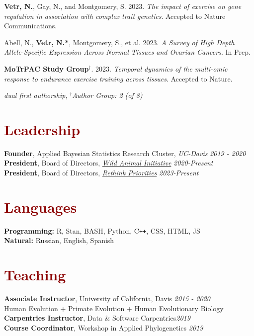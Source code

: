 \documentclass[11pt,margin,line]{resume}
\begin{document}
\begin{resume}
\textbf{Vetr, N.},  Gay,  N.,  and Montgomery,  S.  2023.  \emph{The impact of exercise on gene regulation in association with complex trait genetics}.  Accepted to Nature Communications.

Abell, N., \textbf{Vetr, N.*},  Montgomery, S., et al.  2023.  \emph{A Survey of High Depth Allele-Specific Expression Across Normal Tissues and Ovarian Cancers}.  In Prep.

\textbf{MoTrPAC Study Group}$^{\dag}$. 2023.  \emph{Temporal dynamics of the multi-omic response to endurance exercise training across tissues}.  Accepted to Nature. 

\vspace{-1.5mm}
{\hfill\small*\textit{dual first authorship}, $^{\dag}$\textit{Author Group: 2 (of 8)}}

\vspace{-1.5mm}
\section{\large\textcolor{DarkRed}{Leadership}}
\textbf{Founder}, Applied Bayesian Statistics Research Cluster, \textit{UC-Davis} \hfill \emph{2019 - 2020}\\
\textbf{President}, Board of Directors, \textit{\href{https://www.wildanimalinitiative.org/}{Wild Animal Initiative}} \hfill \emph{2020-Present}\\
\textbf{President}, Board of Directors, \textit{\href{https://rethinkpriorities.org/}{Rethink Priorities}} \hfill \emph{2023-Present}\\

\vspace{-5mm}
\section{\large\textcolor{DarkRed}{Languages}}
\textbf{Programming:} R, Stan, BASH, Python, C\texttt{++}, CSS, HTML, JS\\
\textbf{Natural:} Russian, English, Spanish

\vspace{-1.5mm}
\section{\large\textcolor{DarkRed}{Teaching}}
\textbf{Associate Instructor}, University of California, Davis \hfill \emph{2015  - 2020}
\\Human Evolution + Primate Evolution + Human Evolutionary Biology
\\\textbf{Carpentries Instructor}, Data \& Software Carpentries\hfill \emph{2019}
\\\textbf{Course Coordinator}, Workshop in Applied Phylogenetics \hfill \emph{2019}


\end{resume}
\end{document}
